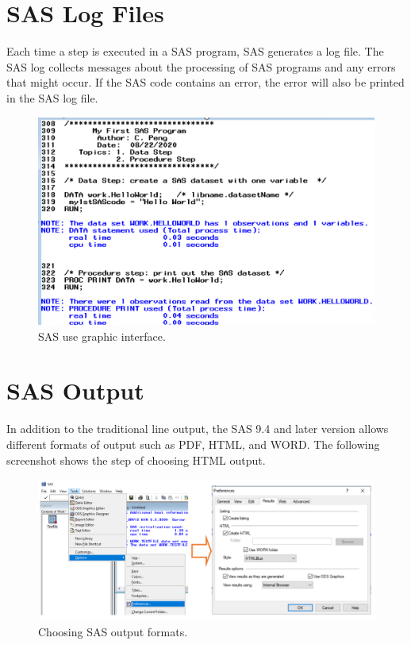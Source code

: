\documentclass[
]{book}
\begin{document}
\hypertarget{sas-log-files}{%
\section{SAS Log Files}\label{sas-log-files}}

Each time a step is executed in a SAS program, SAS generates a log file. The SAS log collects messages about the processing of SAS programs and any errors that might occur. If the SAS code contains an error, the error will also be printed in the SAS log file.

\begin{figure}

{\centering \includegraphics[width=0.7\linewidth]{img01/w01-SASLog} 

}

\caption{SAS use graphic interface.}\label{fig:unnamed-chunk-4}
\end{figure}

\hypertarget{sas-output}{%
\section{SAS Output}\label{sas-output}}

In addition to the traditional line output, the SAS 9.4 and later version allows different formats of output such as PDF, HTML, and WORD. The following screenshot shows the step of choosing HTML output.

\begin{figure}

{\centering \includegraphics[width=1\linewidth]{img01/w01-ChoosingOutputFormat} 

}

\caption{Choosing SAS output formats.}\label{fig:unnamed-chunk-5}
\end{figure}
\end{document}
